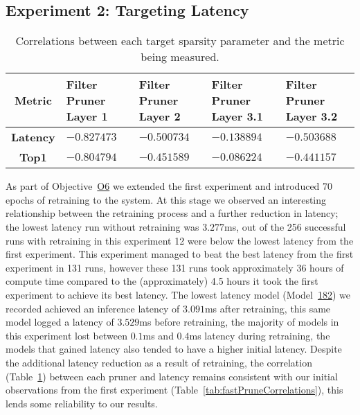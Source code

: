 \documentclass[../Dissertation.tex]{subfiles}
\begin{document}
\subsection{Experiment 2: Targeting Latency}\label{sec:Experiment2}

\singlespacing
\begin{table}[H]
    \centering
    \begin{tabular}{@{}cp{26mm}p{26mm}p{26mm}p{26mm}@{}}
    \toprule
    \textbf{Metric}  & \textbf{Filter Pruner  Layer 1} & \textbf{Filter Pruner Layer 2} & \textbf{Filter Pruner Layer 3.1} & \textbf{Filter Pruner Layer 3.2} \\ \midrule
    \textbf{Latency} & $-0.827473$                        & $-0.500734$                      & $-0.138894$                         & $-0.503688$                         \\
    \textbf{Top1}    & $-0.804794$                        & $-0.451589$                      & $-0.086224$                        & $-0.441157$                        \\ \bottomrule
    \end{tabular}
    \caption{Correlations between each target sparsity parameter and the metric being measured.}
    \label{tab:Ex2PruneCorrelations}
\end{table}
\doublespacing

As part of Objective~\hyperref[obj:AutoParams]{O6} we extended the first experiment and introduced 70 epochs of retraining to the system. 
At this stage we observed an interesting relationship between the retraining process and a further reduction in latency; the lowest latency run without retraining was $3.277$ms, out of the 256 successful runs with retraining in this experiment 12 were below the lowest latency from the first experiment.
This experiment managed to beat the best latency from the first experiment in 131 runs, however these 131 runs took approximately 36 hours of compute time compared to the (approximately) 4.5 hours it took the first experiment to achieve its best latency.
The lowest latency model (Model~\hyperref[sec:sec:unique-sweep-182]{182}) we recorded achieved an inference latency of $3.091$ms after retraining, this same model logged a latency of $3.529$ms before retraining, the majority of models in this experiment lost between $0.1$ms and $0.4$ms latency during retraining, the models that gained latency also tended to have a higher initial latency.
Despite the additional latency reduction as a result of retraining, the correlation (Table~\ref{tab:Ex2PruneCorrelations}) between each pruner and latency remains consistent with our initial observations from the first experiment (Table~\ref{tab:fastPruneCorrelations}), this lends some reliability to our results.
\end{document}

